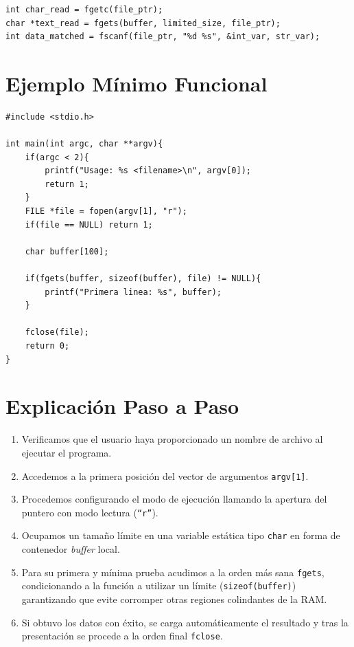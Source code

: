 \documentclass[12pt,a4paper]{article}
\begin{document}
\begin{lstlisting}[numbers=none]
int char_read = fgetc(file_ptr);
char *text_read = fgets(buffer, limited_size, file_ptr);
int data_matched = fscanf(file_ptr, "%d %s", &int_var, str_var);
\end{lstlisting}

\section{Ejemplo Mínimo Funcional}
\begin{lstlisting}
#include <stdio.h>

int main(int argc, char **argv){
    if(argc < 2){
        printf("Usage: %s <filename>\n", argv[0]);
        return 1;
    }
    FILE *file = fopen(argv[1], "r");
    if(file == NULL) return 1;

    char buffer[100];
    
    if(fgets(buffer, sizeof(buffer), file) != NULL){
        printf("Primera linea: %s", buffer);
    }
    
    fclose(file);
    return 0;
}
\end{lstlisting}

\section{Explicación Paso a Paso}
\begin{enumerate}
    \item Verificamos que el usuario haya proporcionado un nombre de archivo al ejecutar el programa.
    \item Accedemos a la primera posición del vector de argumentos \texttt{argv[1]}.
    \item Procedemos configurando el modo de ejecución llamando la apertura del puntero con modo lectura (\texttt{``r''}).
    \item Ocupamos un tamaño límite en una variable estática tipo \texttt{char} en forma de contenedor \textit{buffer} local.
    \item Para su primera y mínima prueba acudimos a la orden más sana \texttt{fgets}, condicionando a la función a utilizar un límite (\texttt{sizeof(buffer)}) garantizando que evite corromper otras regiones colindantes de la RAM.
    \item Si obtuvo los datos con éxito, se carga automáticamente el resultado y tras la presentación se procede a la orden final \texttt{fclose}.
\end{enumerate}
\end{document}
